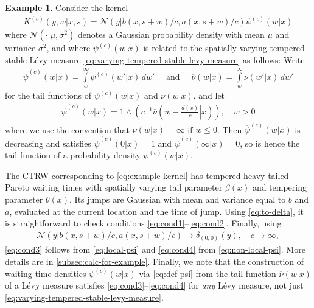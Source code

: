 \documentclass[a4paper,12pt]{elsarticle}
\numberwithin{equation}{section}
\theoremstyle{plain}
\theoremstyle{definition}
\newtheorem{example}[theorem]{Example}
\theoremstyle{remark}
\numberwithin{equation}{section}
\newcommand{\1}{\mathbf 1}
\begin{document}
\begin{example} \label{example}
Consider the kernel 
\begin{align}
\label{eq:example-kernel}
K^{(c)}(y,w|x,s) 
= \mathcal N\left(y | b(x,s+w)/c, a(x,s+w)/c\right)
\psi^{(c)}(w|x)
\end{align}
where $\mathcal N( \cdot | \mu, \sigma^2)$ denotes a Gaussian probability density with 
mean $\mu$ and variance $\sigma^2$, and where $\psi^{(c)}(w|x)$ is related to 
the spatially varying tempered stable L\'evy measure
\eqref{eq:varying-tempered-stable-levy-measure} as follows: 
Write 
\begin{align}
\overline \psi^{(c)}(w|x) = \int\limits_w^\infty \psi^{(c)}(w'|x)\,dw' 
\quad \text{ and } \quad 
\overline \nu(w|x) = \int\limits_w^\infty \nu(w'|x)\,dw'
\end{align}
for the tail functions of $\psi^{(c)}(w|x)$ and $\nu(w|x)$, and let 
\begin{align} \label{eq:def-psi}
\overline \psi^{(c)}(w|x) = 1 \wedge \left . \left( 
  c^{-1} 
  \overline \nu\left( w - \frac{d(x)}{c}\right| x
\right) \right), \quad w > 0
\end{align}
where we use the convention that $\overline \nu(w|x) = \infty$ if $w \le 0$. 
Then $\overline \psi^{(c)}(w|x)$ is decreasing and satisfies $\overline \psi^{(c)}(0|x) = 1$ and $\overline \psi^{(c)}(\infty|x) = 0$, so is hence the tail function of a probability density $\psi^{(c)}(w|x)$. 

The CTRW corresponding to \eqref{eq:example-kernel} has tempered heavy-tailed Pareto waiting times with spatially varying tail parameter $\beta(x)$ and tempering parameter $\theta(x)$. Its jumps are Gaussian with mean and variance equal to $b$ and $a$, evaluated at the current location and the time of jump. 
Using \eqref{eq:to-delta}, it is straightforward to check conditions \eqref{eq:cond1}--\eqref{eq:cond2}. 
Finally, using 
\begin{align}
\mathcal N\left(y | b(x,s+w)/c, a(x,s+w)/c\right) \to \delta_{(0,0)}(y), 
\quad c \to \infty,
\end{align}
\eqref{eq:cond3} follows from \eqref{eq:local-psi} and 
\eqref{eq:cond4} from \eqref{eq:non-local-psi}.
More details are in \ref{subsec:calc-for-example}.
Finally, we note that the construction of waiting time densities 
$\psi^{(c)}(w|x)$ via 
\eqref{eq:def-psi} from the tail function $\overline \nu(w|x)$ of a 
L\'evy measure satisfies \eqref{eq:cond3}--\eqref{eq:cond4} for \emph{any} 
L\'evy measure, not just 
\eqref{eq:varying-tempered-stable-levy-measure}.
\end{example}
\end{document}
